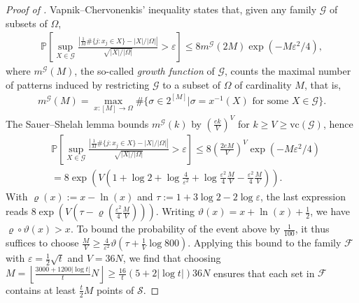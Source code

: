 \documentclass[11pt]{amsart}
\newcommand{\vc}{\mathrm{vc}}
\begin{document}
\begin{proof}[Proof of ]
    Vapnik--Chervonenkis' inequality \cite{VapnikChervonenkis1974} states that, given any family $\mathcal G$ of subsets of $\Omega$,
    \begin{align*}
        \mathbb P \left[ \sup_{X \in \mathcal G} \frac{\left| \tfrac 1M \# \{j: x_j \in X \} - |X|/|\Omega| \right|}{\sqrt{|X|/|\Omega|}} > \varepsilon \right] \leq 8 m^{\mathcal G}(2M) \exp(-M \varepsilon^2/4),
    \end{align*}
    where $m^{\mathcal G}(M)$, the so-called \emph{growth function} of $\mathcal G$, counts the maximal number of patterns induced by restricting $\mathcal G$ to a subset of $\Omega$ of cardinality $M$, that is,
    \begin{align*}
        m^{\mathcal G}(M) = \max_{x: [M] \to \Omega} \# \{\sigma \in 2^{[M]} | \sigma = x^{-1}(X) \text{ for some } X \in \mathcal G\}.
    \end{align*}
    The Sauer--Shelah lemma bounds $m^{\mathcal G}(k)$ by $\left( \frac{ek}{V} \right)^{V}$ for $k \geq V \geq \vc(\mathcal G)$, hence
    \begin{align*}
        &\mathbb P \left[ \sup_{X \in \mathcal G} \frac{\left| \tfrac 1M \# \{j: x_j \in X \} - |X|/|\Omega| \right|}{\sqrt{|X|/|\Omega|}} > \varepsilon \right] \leq 8 \left( \frac{2eM}{V} \right)^{V} \exp(-M \varepsilon^2/4) \\
        &= 8 \exp\left(V \left( 1 + \log 2 + \log \frac{4}{\varepsilon^2} + \log \frac{\varepsilon^2}{4} \frac{M}{V} - \frac{\varepsilon^2}{4} \frac{M}{V} \right) \right).
    \end{align*}
    With $\varrho(x) := x-\ln(x)$ and $\tau := 1 + 3\log 2 - 2 \log \varepsilon$, the last expression reads $8 \exp(V(\tau - \varrho(\frac{\varepsilon^2}{4} \frac{M}{V})))$. Writing $\vartheta(x) = x + \ln(x) + \frac12$, we have $\varrho \circ \vartheta(x) > x$. To bound the probability of the event above by $\frac{1}{100}$, it thus suffices to choose $\frac{M}{V} \geq \frac{4}{\varepsilon^2} \vartheta\left( \tau + \frac1V \log 800\right)$. Applying this bound to the family $\mathcal F$ with $\varepsilon = \frac12 \sqrt{t}$ and $V = 36 N$, we find that choosing $M = \left\lfloor \frac{3000+1200|\log t|}{t} N \right\rfloor \geq \frac{16}{t} (5 + 2|\log t|) 36N$ ensures that each set in $\mathcal F$ contains at least $\frac t2 M$ points of $\mathcal S$.


\end{proof}
\end{document}
